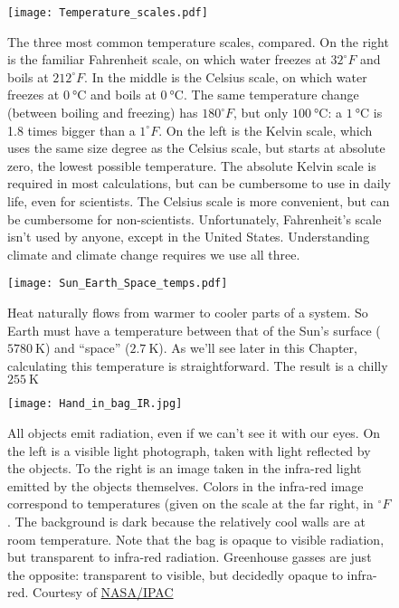 \begin{figure}[p]
\centering
\texttt{[image: Temperature\_scales.pdf]}%
\caption{The three most common temperature scales, compared. On the right is the familiar Fahrenheit scale, on which water freezes at $32 ^{\circ}F$ and boils at $212 ^{\circ}F$. In the middle is the Celsius scale, on which water freezes at $\SI{0}{\degreeCelsius}$ and boils at $\SI{0}{\degreeCelsius}$. The same temperature change (between boiling and freezing) has $180 ^{\circ}F$, but only $\SI{100}{\degreeCelsius}$: a $\SI{1}{\degreeCelsius}$ is 1.8 times bigger than a $1 ^{\circ}F$. On the left is the Kelvin scale, which uses the same size degree as the Celsius scale, but starts at absolute zero, the lowest possible temperature. The absolute Kelvin scale is required in most calculations, but can be cumbersome to use in daily life, even for scientists. The Celsius scale is more convenient, but can be cumbersome for non-scientists. Unfortunately, Fahrenheit's scale isn't used by anyone, except in the United States. Understanding climate and climate change requires we use all three. }
\label{fig:temp_scales}
\end{figure}

\begin{figure}[p]
\centering
\texttt{[image: Sun\_Earth\_Space\_temps.pdf]}%
\caption{Heat naturally flows from warmer to cooler parts of a system. So Earth must have a temperature between that of the Sun's surface ($\SI{5780}{\kelvin}$) and ``space'' ($\SI{2.7}{\kelvin}$). As we'll see later in this Chapter, calculating this temperature is straightforward. The result is a chilly $\SI{255}{\kelvin}$ }
\label{fig:sun_earth_sys_temps}
\end{figure}


\begin{figure}[p]
\centering
\texttt{[image: Hand\_in\_bag\_IR.jpg]}%
\caption{All objects emit radiation, even if we can't see it with our eyes. On the left is a visible light photograph, taken with light reflected by the objects. To the right is an image taken in the infra-red light emitted by the objects themselves. Colors in the infra-red image correspond to temperatures (given on the scale at the far right, in $^{\circ}F$. The background is dark because the relatively cool walls are at room temperature. Note that the bag is opaque to visible radiation, but transparent to infra-red radiation. Greenhouse gasses are just the opposite: transparent to visible, but decidedly opaque to infra-red. Courtesy of \href{http://coolcosmos.ipac.caltech.edu/cosmic_kids/learn_ir/}{NASA/IPAC}}
\label{fig:Hand_IR}
\end{figure}

